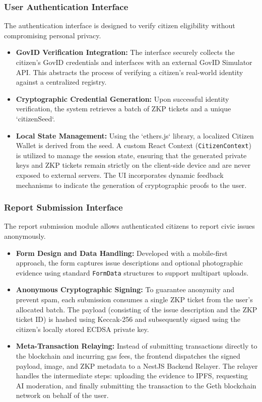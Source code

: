 \subsubsection*{User Authentication Interface}
The authentication interface is designed to verify citizen eligibility without compromising personal privacy.
\begin{itemize}
    \item \textbf{GovID Verification Integration:} The interface securely collects the citizen's GovID credentials and interfaces with an external GovID Simulator API. This abstracts the process of verifying a citizen's real-world identity against a centralized registry.
    \item \textbf{Cryptographic Credential Generation:} Upon successful identity verification, the system retrieves a batch of \ac{ZKP} tickets and a unique `citizenSeed`. 
    \item \textbf{Local State Management:} Using the `ethers.js` library, a localized Citizen Wallet is derived from the seed. A custom React Context (\texttt{CitizenContext}) is utilized to manage the session state, ensuring that the generated private keys and ZKP tickets remain strictly on the client-side device and are never exposed to external servers. The UI incorporates dynamic feedback mechanisms to indicate the generation of cryptographic proofs to the user.
\end{itemize}

\subsubsection*{Report Submission Interface}
The report submission module allows authenticated citizens to report civic issues anonymously.
\begin{itemize}
    \item \textbf{Form Design and Data Handling:} Developed with a mobile-first approach, the form captures issue descriptions and optional photographic evidence using standard \texttt{FormData} structures to support multipart uploads.
    \item \textbf{Anonymous Cryptographic Signing:} To guarantee anonymity and prevent spam, each submission consumes a single ZKP ticket from the user's allocated batch. The payload (consisting of the issue description and the ZKP ticket ID) is hashed using Keccak-256 and subsequently signed using the citizen's locally stored ECDSA private key.
    \item \textbf{Meta-Transaction Relaying:} Instead of submitting transactions directly to the blockchain and incurring gas fees, the frontend dispatches the signed payload, image, and ZKP metadata to a NestJS Backend Relayer. The relayer handles the intermediate steps: uploading the evidence to IPFS, requesting AI moderation, and finally submitting the transaction to the Geth blockchain network on behalf of the user.
\end{itemize}

